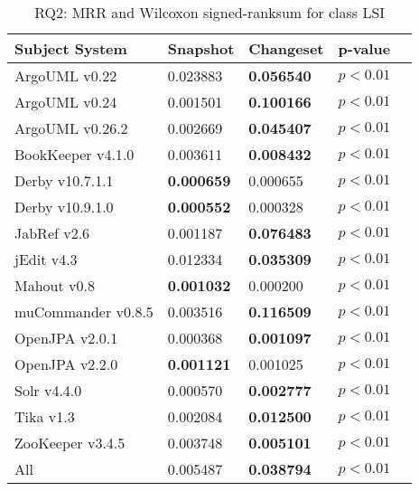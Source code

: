 
\begin{table}[t]
\renewcommand{\arraystretch}{1.3}
\footnotesize
\centering
\caption{RQ2: MRR and Wilcoxon signed-ranksum for class LSI}
\begin{tabular}{l|ll|ll}
   \toprule
    Subject System & Snapshot & Changeset & p-value  \\
    \midrule

ArgoUML v0.22 & 0.023883 & {\bf 0.056540 } & $p < 0.01$ \\
ArgoUML v0.24 & 0.001501 & {\bf 0.100166 } & $p < 0.01$ \\
ArgoUML v0.26.2 & 0.002669 & {\bf 0.045407 } & $p < 0.01$ \\
BookKeeper v4.1.0 & 0.003611 & {\bf 0.008432 } & $p < 0.01$ \\
Derby v10.7.1.1 & {\bf 0.000659 } & 0.000655 & $p < 0.01$ \\
Derby v10.9.1.0 & {\bf 0.000552 } & 0.000328 & $p < 0.01$ \\
JabRef v2.6 & 0.001187 & {\bf 0.076483 } & $p < 0.01$ \\
jEdit v4.3 & 0.012334 & {\bf 0.035309 } & $p < 0.01$ \\
Mahout v0.8 & {\bf 0.001032 } & 0.000200 & $p < 0.01$ \\
muCommander v0.8.5 & 0.003516 & {\bf 0.116509 } & $p < 0.01$ \\
OpenJPA v2.0.1 & 0.000368 & {\bf 0.001097 } & $p < 0.01$ \\
OpenJPA v2.2.0 & {\bf 0.001121 } & 0.001025 & $p < 0.01$ \\
Solr v4.4.0 & 0.000570 & {\bf 0.002777 } & $p < 0.01$ \\
Tika v1.3 & 0.002084 & {\bf 0.012500 } & $p < 0.01$ \\
ZooKeeper v3.4.5 & 0.003748 & {\bf 0.005101 } & $p < 0.01$ \\
\midrule
All & 0.005487 & {\bf 0.038794 } & $p < 0.01$ \\

    \bottomrule
\end{tabular}
\label{table:rq2:class:lsi}
\end{table}

